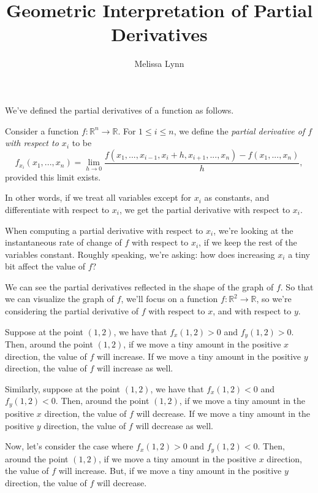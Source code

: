 \documentclass{ximera}
\title{Geometric Interpretation of Partial Derivatives}
\author{Melissa Lynn}
\begin{document}
\begin{abstract}
\end{abstract}
\maketitle

We've defined the partial derivatives of a function as follows.

\begin{definition}
Consider a function $f:\mathbb{R}^n\rightarrow\mathbb{R}$. For $1\leq i\leq n$, we define the \emph{partial derivative of $f$ with respect to $x_i$} to be
\[
f_{x_i}(x_1,...,x_n) = \lim_{h\rightarrow 0}\frac{f(x_1,...,x_{i-1}, x_i+h, x_{i+1},...,x_n)-f(x_1,...,x_n)}{h},
\]
provided this limit exists.
\end{definition}

In other words, if we treat all variables except for $x_i$ as constants, and differentiate with respect to $x_i$, we get the partial derivative with respect to $x_i$. 

When computing a partial derivative with respect to $x_i$, we're looking at the instantaneous rate of change of $f$ with respect to $x_i$, if we keep the rest of the variables constant. Roughly speaking, we're asking: how does increasing $x_i$ a tiny bit affect the value of $f$?

We can see the partial derivatives reflected in the shape of the graph of $f$. So that we can visualize the graph of $f$, we'll focus on a function $f:\mathbb{R}^2\rightarrow\mathbb{R}$, so we're considering the partial derivative of $f$ with respect to $x$, and with respect to $y$.

Suppose at the point $(1,2)$, we have that $f_x(1,2)>0$ and $f_y(1,2)>0$. Then, around the point $(1,2)$, if we move a tiny amount in the positive $x$ direction, the value of $f$ will increase. If we move a tiny amount in the positive $y$ direction, the value of $f$ will increase as well.


Similarly, suppose at the point $(1,2)$, we have that $f_x(1,2)<0$ and $f_y(1,2)<0$. Then, around the point $(1,2)$, if we move a tiny amount in the positive $x$ direction, the value of $f$ will decrease. If we move a tiny amount in the positive $y$ direction, the value of $f$ will decrease as well.


Now, let's consider the case where $f_x(1,2)>0$ and $f_y(1,2)<0$. Then, around the point $(1,2)$, if we move a tiny amount in the positive $x$ direction, the value of $f$ will increase. But, if we move a tiny amount in the positive $y$ direction, the value of $f$ will decrease.
\end{document}
